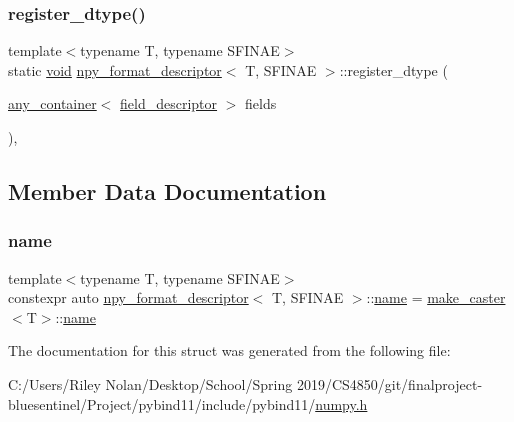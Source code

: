 \subsubsection{\texorpdfstring{register\_dtype()}{register\_dtype()}}
{\footnotesize\ttfamily template$<$typename T, typename S\+F\+I\+N\+AE$>$ \\
static \mbox{\hyperlink{_s_d_l__opengles2__gl2ext_8h_ae5d8fa23ad07c48bb609509eae494c95}{void}} \mbox{\hyperlink{structnpy__format__descriptor}{npy\+\_\+format\+\_\+descriptor}}$<$ T, S\+F\+I\+N\+AE $>$\+::register\+\_\+dtype (\begin{DoxyParamCaption}\item[{\mbox{\hyperlink{classany__container}{any\+\_\+container}}$<$ \mbox{\hyperlink{structfield__descriptor}{field\+\_\+descriptor}} $>$}]{fields }\end{DoxyParamCaption})\hspace{0.3cm}{\ttfamily [inline]}, {\ttfamily [static]}}



\subsection{Member Data Documentation}
\mbox{\label{structnpy__format__descriptor_af6c52fd43c97ce1c90ddc72f91a746fb}} 
\subsubsection{\texorpdfstring{name}{name}}
{\footnotesize\ttfamily template$<$typename T, typename S\+F\+I\+N\+AE$>$ \\
constexpr auto \mbox{\hyperlink{structnpy__format__descriptor}{npy\+\_\+format\+\_\+descriptor}}$<$ T, S\+F\+I\+N\+AE $>$\+::\mbox{\hyperlink{structname}{name}} = \mbox{\hyperlink{cast_8h_ab32b52411a6b07420516d79074815713}{make\+\_\+caster}}$<$T$>$\+::\mbox{\hyperlink{structname}{name}}\hspace{0.3cm}{\ttfamily [static]}}



The documentation for this struct was generated from the following file\+:\begin{DoxyCompactItemize}
\item 
C\+:/\+Users/\+Riley Nolan/\+Desktop/\+School/\+Spring 2019/\+C\+S4850/git/finalproject-\/bluesentinel/\+Project/pybind11/include/pybind11/\mbox{\hyperlink{numpy_8h}{numpy.\+h}}\end{DoxyCompactItemize}
